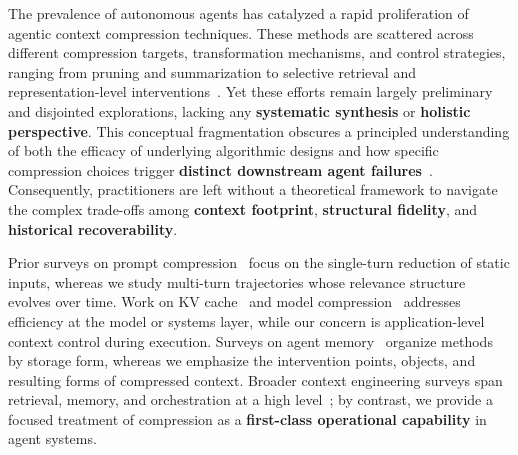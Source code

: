 The prevalence of autonomous agents has catalyzed a rapid proliferation of agentic context compression techniques. These methods are scattered across different compression targets, transformation mechanisms, and control strategies, ranging from pruning and summarization to selective retrieval and representation-level interventions~\citep{lindenbauer2025complexitytrapsimpleobservation, xiao2025improving, wu2026resumunlockinglonghorizonsearch, ye2025agentfoldlonghorizonwebagents, wu2026contextweaverselectivedependencystructuredmemory, wu2026gitcontextcontrollermanage, feng2026agentocrreimaginingagenthistory, wu2026crossmodalmemorycompressionefficient}. Yet these efforts remain largely preliminary and disjointed explorations, lacking any \textbf{systematic synthesis} or \textbf{holistic perspective}. This conceptual fragmentation obscures a principled understanding of both the efficacy of underlying algorithmic designs and how specific compression choices trigger \textbf{distinct downstream agent failures}~\citep{mei2025surveycontextengineeringlarge}. Consequently, practitioners are left without a theoretical framework to navigate the complex trade-offs among \textbf{context footprint}, \textbf{structural fidelity}, and \textbf{historical recoverability}.

Prior surveys on prompt compression~\citep{jiang-etal-2023-llmlingua, li2025prompt} focus on the single-turn reduction of static inputs, whereas we study multi-turn trajectories whose relevance structure evolves over time. Work on KV cache~\citep{li2024survey, liu2025kv, mathurunderstanding} and model compression~\citep{zhu2024survey, liu2025survey, xu2023survey} addresses efficiency at the model or systems layer, while our concern is application-level context control during execution. Surveys on agent memory~\citep{tang2026llm, zhang2025survey, hu2025memory} organize methods by storage form, whereas we emphasize the intervention points, objects, and resulting forms of compressed context. Broader context engineering surveys span retrieval, memory, and orchestration at a high level~\citep{mei2025surveycontextengineeringlarge}; by contrast, we provide a focused treatment of compression as a \textbf{first-class operational capability} in agent systems.

